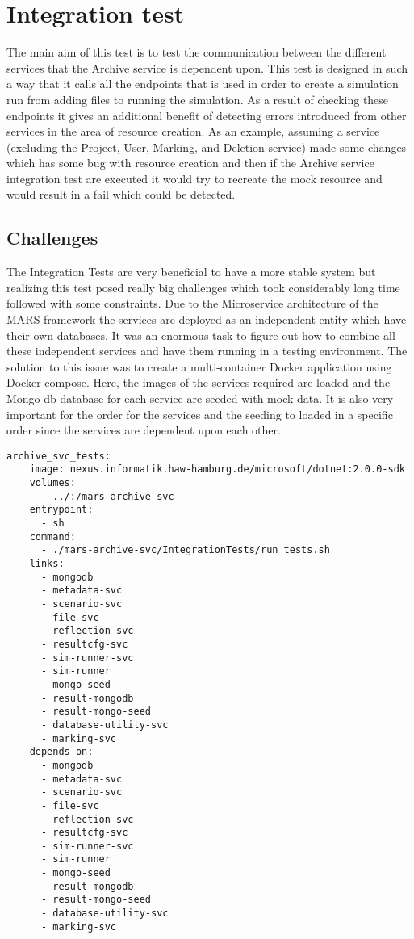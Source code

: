 \section{Integration test}
The main aim of this test is to test the communication between the different services that the Archive service is dependent upon. This test is designed in 
such a way that it calls all the endpoints that is used in order to create a simulation run from adding files to running the simulation. As a result of checking
these endpoints it gives an additional benefit of detecting errors introduced from other services in the area of resource creation. As an example, assuming a service
(excluding the Project, User, Marking, and Deletion service)
made some changes which has some bug with resource creation and then if the Archive service integration test are executed it would try to recreate the mock resource
and would result in a fail which could be detected.

\subsection{Challenges}
The Integration Tests are very beneficial to have a more stable system but realizing this test posed really big challenges which took considerably long time followed 
with some constraints. Due to the Microservice architecture of the MARS framework the services are deployed as an independent entity which have their own databases.
It was an enormous task to figure out how to combine all these independent services and have them running in a testing environment. The solution to this issue
was to create a multi-container Docker application using Docker-compose. Here, the images of the services required are loaded and the Mongo db database for each
service are seeded with mock data. It is also very important for the order for the services and the seeding to loaded in a specific order since the services are dependent upon
each other.  

\begin{lstlisting}[language=docker-compose,caption={Docker compose configuration snippet for Archive service Integration Test}, captionpos=b, breaklines=true,label={code:integCompose}]
archive_svc_tests:
    image: nexus.informatik.haw-hamburg.de/microsoft/dotnet:2.0.0-sdk
    volumes:
      - ../:/mars-archive-svc
    entrypoint:
      - sh
    command:
      - ./mars-archive-svc/IntegrationTests/run_tests.sh
    links:
      - mongodb
      - metadata-svc
      - scenario-svc
      - file-svc
      - reflection-svc
      - resultcfg-svc
      - sim-runner-svc
      - sim-runner
      - mongo-seed
      - result-mongodb
      - result-mongo-seed
      - database-utility-svc
      - marking-svc
    depends_on:
      - mongodb
      - metadata-svc
      - scenario-svc
      - file-svc
      - reflection-svc
      - resultcfg-svc
      - sim-runner-svc
      - sim-runner
      - mongo-seed
      - result-mongodb
      - result-mongo-seed
      - database-utility-svc
      - marking-svc
\end{lstlisting}      


